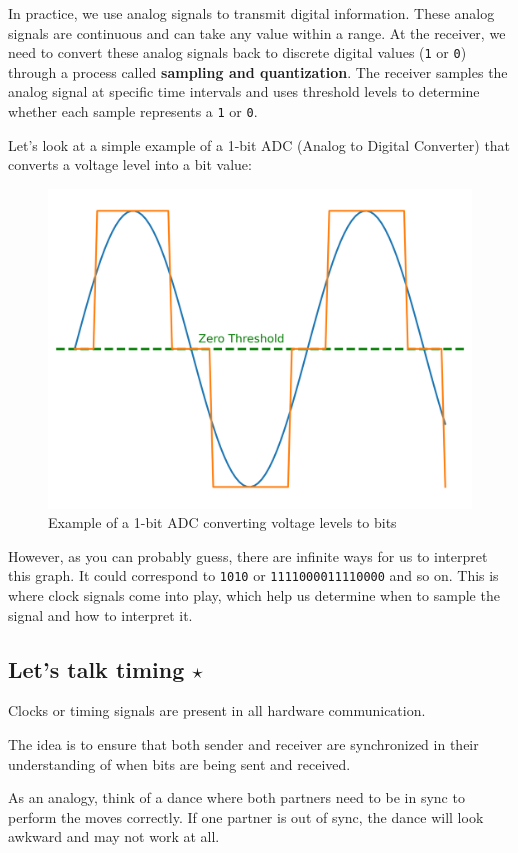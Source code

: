 In practice, we use analog signals to transmit digital information. These analog signals are continuous and can take any value within a range. At the receiver, we need to convert these analog signals back to discrete digital values (\texttt{1} or \texttt{0}) through a process called \textbf{sampling and quantization}. The receiver samples the analog signal at specific time intervals and uses threshold levels to determine whether each sample represents a \texttt{1} or \texttt{0}.

Let's look at a simple example of a 1-bit ADC (Analog to Digital Converter) that converts a voltage level into a bit value:

\begin{figure}[h]
    \centering
    \includegraphics[width=.5\textwidth]{assets/osi/physical/adc_plot.png}
    \caption{Example of a 1-bit ADC converting voltage levels to bits}\label{fig:adc_plot}
\end{figure}

However, as you can probably guess, there are infinite ways for us to interpret this graph. It could correspond to \texttt{1010} or \texttt{1111000011110000} and so on. 
This is where clock signals come into play, which help us determine when to sample the signal and how to interpret it.

\subsection*{Let's talk timing $\star$}
Clocks or timing signals are present in all hardware communication. 

The idea is to ensure that both sender and receiver are synchronized in their understanding of when bits are being sent and received. 

As an analogy, think of a dance where both partners need to be in sync to perform the moves correctly. If one partner is out of sync, the dance will look awkward and may not work at all.


